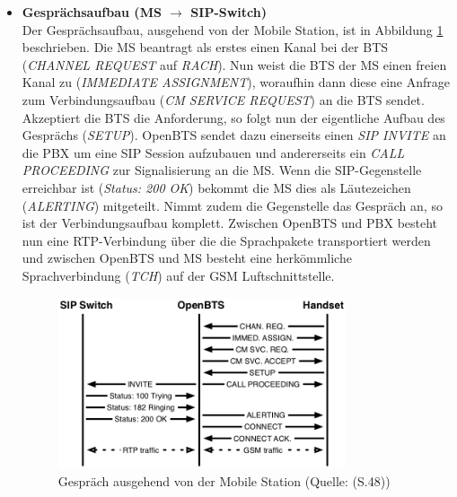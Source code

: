 \begin{itemize}
\item \textbf{Gesprächsaufbau (MS $\rightarrow$ SIP-Switch)}\\
Der Gesprächsaufbau, ausgehend von der Mobile Station, ist in Abbildung \ref{fig:openbts_call_msside} beschrieben. Die MS beantragt als erstes einen Kanal bei der BTS (\textit{CHANNEL REQUEST} auf \textit{RACH}). Nun weist die BTS der MS einen freien Kanal zu (\textit{IMMEDIATE ASSIGNMENT}), woraufhin dann diese eine Anfrage zum Verbindungsaufbau (\textit{CM SERVICE REQUEST}) an die BTS sendet. Akzeptiert die BTS die Anforderung, so folgt nun der eigentliche Aufbau des Gesprächs (\textit{SETUP}). OpenBTS sendet dazu einerseits einen \textit{SIP INVITE} an die PBX um eine SIP Session aufzubauen und andererseits ein \textit{CALL PROCEEDING} zur Signalisierung an die MS. Wenn die SIP-Gegenstelle erreichbar ist (\textit{Status: 200 OK}) bekommt die MS dies als Läutezeichen (\textit{ALERTING}) mitgeteilt. Nimmt zudem die Gegenstelle das Gespräch an, so ist der Verbindungsaufbau komplett. Zwischen OpenBTS und PBX besteht nun eine RTP-Verbindung über die die Sprachpakete transportiert werden und zwischen OpenBTS und MS besteht eine herkömmliche Sprachverbindung (\textit{TCH}) auf der GSM Luftschnittstelle.
\begin{figure}[h]
	\centering
		\includegraphics[width=0.80\textwidth]{img/openbts_call_msside.png}
	\caption{Gespräch ausgehend von der Mobile Station (Quelle: \cite{bib:openbtsmanual}(S.48))}
	\label{fig:openbts_call_msside}
\end{figure}
\end{itemize}
